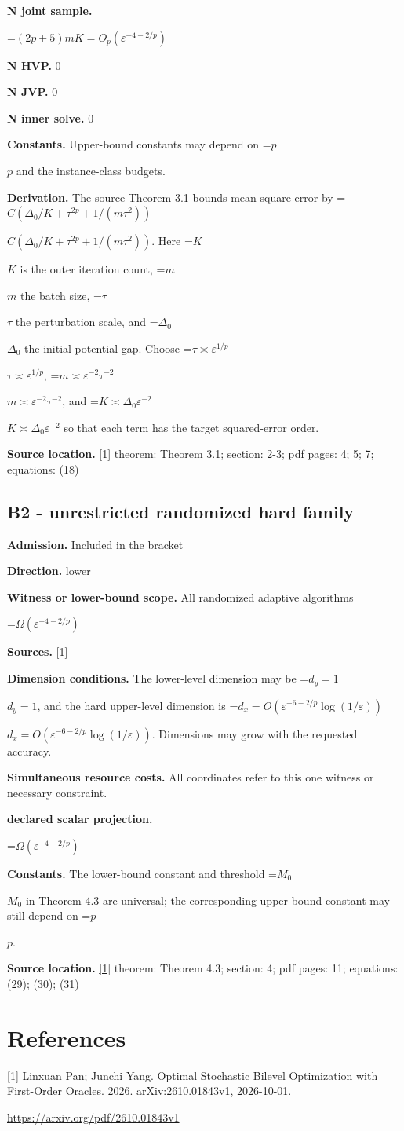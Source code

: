 \documentclass[10pt,a4paper]{article}
\newcommand{\AtlasMath}[1]{\par\begingroup\centering\setbox0=\hbox{$\displaystyle #1$}\ifdim\wd0>1.4\linewidth\typeout{ATLAS WIDE FORMULA: \the\wd0}\fi\ifdim\wd0>\linewidth\resizebox{\linewidth}{!}{\box0}\else\box0\fi\par\endgroup}
\newcommand{\AtlasInlineMath}[1]{\begingroup\setbox0=\hbox{$#1$}\ifdim\wd0>.4\linewidth\endgroup\AtlasMath{#1}\else\endgroup$#1$\fi}
\begin{document}
\textbf{N joint sample.}

\AtlasMath{(2p+5)mK=O_p(\varepsilon ^{-4-2/p})}
\textbf{N HVP.} 0

\textbf{N JVP.} 0

\textbf{N inner solve.} 0

\textbf{Constants.} Upper-bound constants may depend on \AtlasInlineMath{p} and the instance-class budgets.

\textbf{Derivation.} The source Theorem 3.1 bounds mean-square error by \AtlasInlineMath{C(\Delta_0/K+\tau^{2p}+1/(m\tau^2))}. Here \AtlasInlineMath{K} is the outer iteration count, \AtlasInlineMath{m} the batch size, \AtlasInlineMath{\tau} the perturbation scale, and \AtlasInlineMath{\Delta_0} the initial potential gap. Choose \AtlasInlineMath{\tau\asymp\varepsilon^{1/p}}, \AtlasInlineMath{m\asymp\varepsilon^{-2}\tau^{-2}}, and \AtlasInlineMath{K\asymp\Delta_0\varepsilon^{-2}} so that each term has the target squared-error order.

\textbf{Source location.} \href{https://arxiv.org/pdf/2610.01843v1}{[1]} theorem: Theorem 3.1; section: 2-3; pdf pages: 4; 5; 7; equations: (18)

\subsection{B2 - unrestricted randomized hard family}
\textbf{Admission.} Included in the bracket

\textbf{Direction.} lower

\textbf{Witness or lower-bound scope.} All randomized adaptive algorithms

\AtlasMath{\Omega(\varepsilon^{-4-2/p})}
\textbf{Sources.} \href{https://arxiv.org/pdf/2610.01843v1}{[1]}

\textbf{Dimension conditions.} The lower-level dimension may be \AtlasInlineMath{d_y=1}, and the hard upper-level dimension is \AtlasInlineMath{d_x=O(\varepsilon^{-6-2/p}\log(1/\varepsilon))}. Dimensions may grow with the requested accuracy.

\textbf{Simultaneous resource costs.} All coordinates refer to this one witness or necessary constraint.

\textbf{declared scalar projection.}

\AtlasMath{\Omega (\varepsilon ^{-4-2/p})}
\textbf{Constants.} The lower-bound constant and threshold \AtlasInlineMath{M_0} in Theorem 4.3 are universal; the corresponding upper-bound constant may still depend on \AtlasInlineMath{p}.

\textbf{Source location.} \href{https://arxiv.org/pdf/2610.01843v1}{[1]} theorem: Theorem 4.3; section: 4; pdf pages: 11; equations: (29); (30); (31)

\section{References}
[1] Linxuan Pan; Junchi Yang. Optimal Stochastic Bilevel Optimization with First-Order Oracles. 2026. arXiv:2610.01843v1, 2026-10-01.

\url{https://arxiv.org/pdf/2610.01843v1}
\end{document}
